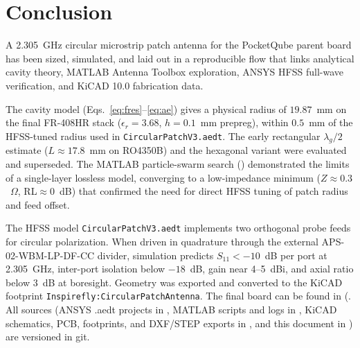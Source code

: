 %
%
%
%

\chapter{Conclusion}

A 2.305~GHz circular microstrip patch antenna for the PocketQube parent board has been sized, simulated, and laid out in a reproducible flow that links analytical cavity theory, MATLAB Antenna Toolbox exploration, ANSYS HFSS full-wave verification, and KiCAD 10.0 fabrication data.

The cavity model (Eqs.~\ref{eq:fres}--\ref{eq:ae}) gives a physical radius of $19.87$~mm on the final FR-408HR stack ($\epsilon_r=3.68$, $h=0.1$~mm prepreg), within $0.5$~mm of the HFSS-tuned radius used in \texttt{CircularPatchV3.aedt}. The early rectangular $\lambda_g/2$ estimate ($L\approx 17.8$~mm on RO4350B) and the hexagonal variant were evaluated and superseded. The MATLAB particle-swarm search () demonstrated the limits of a single-layer lossless model, converging to a low-impedance minimum ($Z\approx 0.3$~$\Omega$, RL${}\approx 0$~dB) that confirmed the need for direct HFSS tuning of patch radius and feed offset.

The HFSS model \texttt{CircularPatchV3.aedt} implements two orthogonal probe feeds for circular polarization. When driven in quadrature through the external APS-02-WBM-LP-DF-CC divider, simulation predicts $S_{11} < -10$~dB per port at 2.305~GHz, inter-port isolation below $-18$~dB, gain near 4--5~dBi, and axial ratio below 3~dB at boresight. Geometry was exported and converted to the KiCAD footprint \texttt{Inspirefly:CircularPatchAntenna}. The final board can be found in (. All sources (ANSYS .aedt projects in , MATLAB scripts and logs in , KiCAD schematics, PCB, footprints, and DXF/STEP exports in , and this document in ) are versioned in  git.

